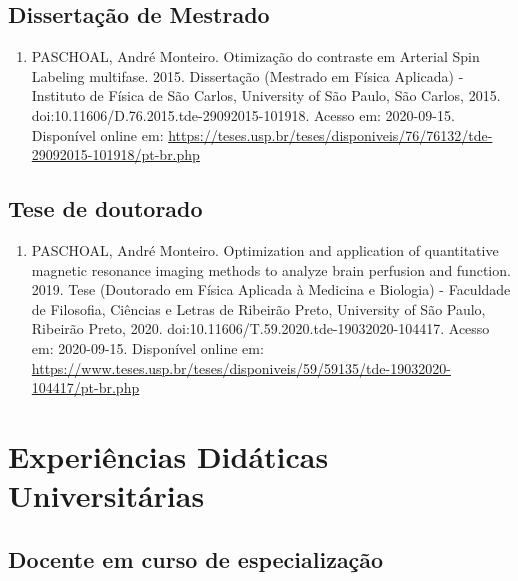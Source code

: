 \documentclass[a4paper,oneside,10pt]{article}
\begin{document}
\subsection{Dissertação de Mestrado}
\vspace{0.3cm}

\begin{enumerate}
\renewcommand{\labelenumi}{{\large\bfseries\arabic{enumi}.}}

        \item PASCHOAL, André Monteiro. Otimização do contraste em Arterial Spin Labeling multifase. 2015. Dissertação (Mestrado em Física Aplicada) - Instituto de Física de São Carlos, University of São Paulo, São Carlos, 2015. doi:10.11606/D.76.2015.tde-29092015-101918. Acesso em: 2020-09-15. Disponível online em: \url{https://teses.usp.br/teses/disponiveis/76/76132/tde-29092015-101918/pt-br.php}

\end{enumerate}

\subsection{Tese de doutorado}
\vspace{0.3cm}

\begin{enumerate}
\renewcommand{\labelenumi}{{\large\bfseries\arabic{enumi}.}}

        \item PASCHOAL, André Monteiro. Optimization and application of quantitative magnetic resonance imaging methods to analyze brain perfusion and function. 2019. Tese (Doutorado em Física Aplicada à Medicina e Biologia) - Faculdade de Filosofia, Ciências e Letras de Ribeirão Preto, University of São Paulo, Ribeirão Preto, 2020. doi:10.11606/T.59.2020.tde-19032020-104417. Acesso em: 2020-09-15. Disponível online em: \url{https://www.teses.usp.br/teses/disponiveis/59/59135/tde-19032020-104417/pt-br.php}

\end{enumerate}

\newpage
\section{Experiências Didáticas Universitárias}

\subsection{Docente em curso de especialização}
\end{document}
